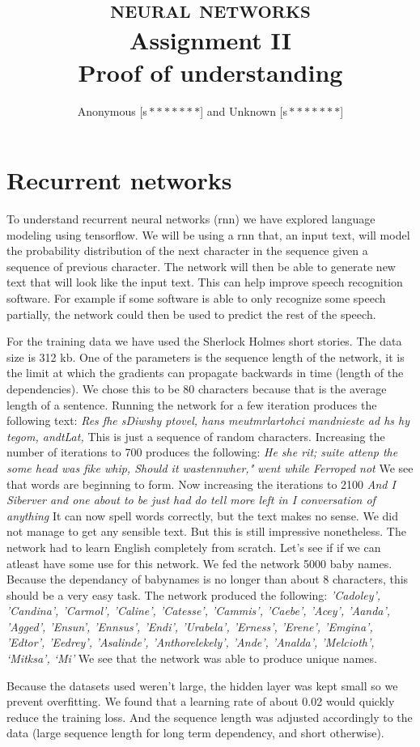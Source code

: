 \documentclass[11pt]{article}
\author{Anonymous [s\,$*******$] and Unknown [s\,$*******$]}
\title{\textsc{\Huge neural networks}\\Assignment II\\[6mm]\large\bf Proof of understanding}
\begin{document}
\maketitle
\section{Recurrent networks}
To understand recurrent neural networks (rnn) we have explored language modeling using tensorflow.  We will be using a rnn that, an input text, will model the probability distribution of the next character in the sequence given a sequence of previous character. The network will then be able to generate new text that will look like the input text. This can help improve speech recognition software. For example if some software is able to only recognize some speech partially, the network could then be used to predict the rest of the speech.\par
For the training data we have used the Sherlock Holmes short stories. The data size is 312 kb. One of the parameters is the sequence length of the network, it is the limit at which the gradients can propagate backwards in time (length of the dependencies). We chose this to be 80 characters because that is the average length of a sentence. Running the network for a few iteration produces the following text: \textit{Res fhe sDiwshy ptovel, hans meutmrlartohci mandnieste ad hs hy tegom, andtLat,}
This is just a sequence of random characters. Increasing the number of iterations to 700 produces the following:
\textit{He she rit; suite attenp the some head was fike whip, Should it wastennwher,"}
\textit{ went while Ferroped not}
We see that words are beginning to form. Now increasing the iterations to 2100
\textit{And I Siberver and one   about to be just had do tell more left in I conversation of anything}
It can now spell words correctly, but the text makes no sense. We did not manage to get any sensible text. But this is still impressive nonetheless. The network had to learn English completely from scratch. Let's see if if we can atleast have some use for this network. We fed the network 5000 baby names. Because the dependancy of babynames is no longer than about 8 characters, this should be a very easy task. The network produced the following:
\textit{ 'Cadoley', 'Candina', 'Carmol', 'Caline', 'Catesse', 'Cammis', 'Caebe', 'Acey', 'Aanda',}\\
\textit{ 'Agged', 'Ensun', 'Ennsus', 'Endi', 'Urabela', 'Erness', 'Erene', 'Emgina', 'Edtor', 'Eedrey',}
\textit{ 'Asalinde', 'Anthorelekely', 'Ande', 'Analda', 'Melcioth', `Mitksa', `Mi'}
We see that the network was able to produce unique names.\par
Because the datasets used weren't large, the hidden layer was kept small so we prevent overfitting. We found that a learning rate of about 0.02 would quickly reduce the training loss. And the sequence length was adjusted accordingly to the data (large sequence length for long term dependency, and short otherwise).
\end{document}
